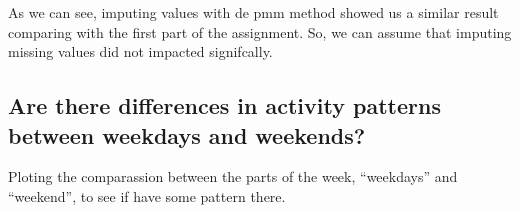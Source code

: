 \documentclass[]{article}
\newenvironment{Shaded}{\begin{snugshade}}{\end{snugshade}}
\newcommand{\DataTypeTok}[1]{\textcolor[rgb]{0.13,0.29,0.53}{#1}}
\newcommand{\KeywordTok}[1]{\textcolor[rgb]{0.13,0.29,0.53}{\textbf{#1}}}
\newcommand{\NormalTok}[1]{#1}
\newcommand{\OperatorTok}[1]{\textcolor[rgb]{0.81,0.36,0.00}{\textbf{#1}}}
\newcommand{\StringTok}[1]{\textcolor[rgb]{0.31,0.60,0.02}{#1}}
\begin{document}
As we can see, imputing values with de pmm method showed us a similar
result comparing with the first part of the assignment. So, we can
assume that imputing missing values did not impacted signifcally.

\hypertarget{are-there-differences-in-activity-patterns-between-weekdays-and-weekends}{%
\subsection{Are there differences in activity patterns between weekdays
and
weekends?}\label{are-there-differences-in-activity-patterns-between-weekdays-and-weekends}}

\begin{Shaded}
\end{Shaded}

Ploting the comparassion between the parts of the week, ``weekdays'' and
``weekend'', to see if have some pattern there.

\begin{Shaded}
\end{Shaded}
\end{document}
